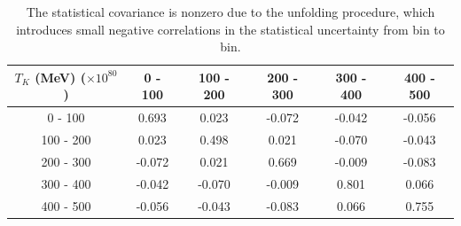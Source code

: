 \documentclass[aps,prl,preprint,showpacs,superscriptaddress,nofootinbib,floatfix,linenumbers]{revtex4}
\begin{document}
\begingroup
\squeezetable
\begin{table}
\begin{tabular}{cccccc}
\hline\hline
$T_{K}$ (MeV) ($\times 10^{80}$) &   0 - 100 & 100 - 200 & 200 - 300 & 300 - 400 & 400 - 500 \\
\hline
  0 - 100 & 0.693 & 0.023 & -0.072 & -0.042 & -0.056 \\
100 - 200 & 0.023 & 0.498 & 0.021 & -0.070 & -0.043 \\
200 - 300 & -0.072 & 0.021 & 0.669 & -0.009 & -0.083 \\
300 - 400 & -0.042 & -0.070 & -0.009 & 0.801 & 0.066 \\
400 - 500 & -0.056 & -0.043 & -0.083 & 0.066 & 0.755 \\
\hline\hline
\end{tabular}
\caption{The statistical covariance is nonzero due to the unfolding procedure, which introduces small negative correlations in the statistical uncertainty from bin to bin.}
\label{tab:matrix}
\end{table}
\endgroup
\end{document}
